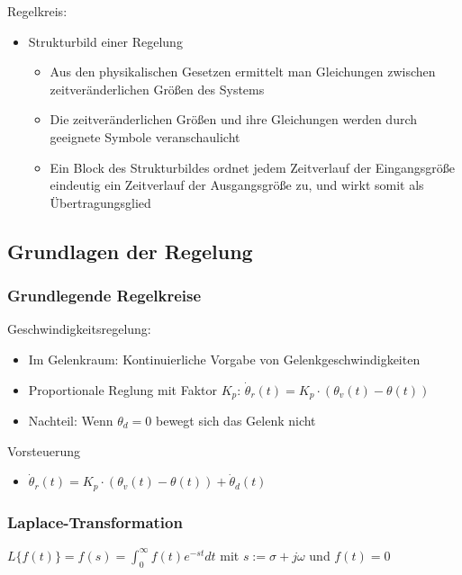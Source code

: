 \documentclass[paper=a4, fontsize=11pt]{scrartcl} %
\numberwithin{equation}{section} %
\numberwithin{figure}{section} %
\numberwithin{table}{section} %
\begin{document}
Regelkreis:
\begin{itemize}
\item Strukturbild einer Regelung
\begin{itemize}
\item Aus den physikalischen Gesetzen ermittelt man Gleichungen zwischen zeitveränderlichen Größen des Systems
\item Die zeitveränderlichen Größen und ihre Gleichungen werden durch geeignete Symbole veranschaulicht
\item Ein Block des Strukturbildes ordnet jedem Zeitverlauf der Eingangsgröße eindeutig ein Zeitverlauf der Ausgangsgröße zu, und wirkt somit als Übertragungsglied
\end{itemize}
\end{itemize}

\subsection{Grundlagen der Regelung}

\subsubsection{Grundlegende Regelkreise}

Geschwindigkeitsregelung:
\begin{itemize}
\item Im Gelenkraum: Kontinuierliche Vorgabe von Gelenkgeschwindigkeiten
\item Proportionale Reglung mit Faktor $K_p$: $\dot \theta_r(t) = K_p \cdot (\theta_v(t) - \theta(t))$
\item Nachteil: Wenn $\theta_d = 0$ bewegt sich das Gelenk nicht
\end{itemize}

Vorsteuerung
\begin{itemize}
\item $\dot \theta_r(t) = K_p \cdot (\theta_v(t) - \theta(t)) + \dot \theta_d(t)$
\end{itemize}

\subsubsection{Laplace-Transformation}

$L\{f(t)\} = f(s) = \int_0^\infty f(t)e^{-st} dt$ mit $s:= \sigma + j \omega$ und $f(t)=0$
\end{document}

